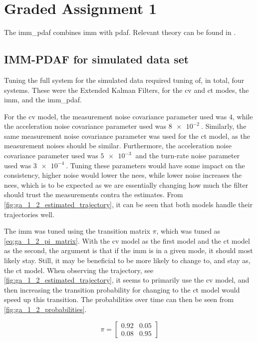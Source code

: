 \section{Graded Assignment 1}\label{sec:graded_assignment_1}
The \acrshort{imm_pdaf} combines \acrfull{imm} with \acrfull{pdaf}. Relevant theory can be found in \cite[p. 100-101, 120 - 122]{Edmund}. 

\subsection{IMM-PDAF for simulated data set}
Tuning the full system for the simulated data required tuning of, in total, four systems. These were the Extended Kalman Filters, for the \acrfull{cv} and \acrfull{ct} modes, the \acrshort{imm}, and the \acrshort{imm_pdaf}. 

For the \acrshort{cv} model, the measurement noise covariance parameter used was $4$, while the acceleration noise covariance parameter used was $\SI{8e-2}{}$. Similarly, the same measurement noise covariance parameter was used for the \acrshort{ct} model, as the measurement noises should be similar. Furthermore, the acceleration noise covariance parameter used was $\SI{5e-3}{}$ and the turn-rate noise parameter used was $\SI{3e-4}{}$. Tuning these parameters would have some impact on the consistency, higher noise would lower the \acrshort{nees}, while lower noise increases the \acrshort{nees}, which is to be expected as we are essentially changing how much the filter should trust the measurements contra the estimates. From \cref{fig:ga_1_2_estimated_trajectory}, it can be seen that both models handle their trajectories well. 

The \acrshort{imm} was tuned using the transition matrix $\pi$, which was tuned as \cref{eq:ga_1_2_pi_matrix}. With the \acrshort{cv} model as the first model and the \acrshort{ct} model as the second, the argument is that if the \acrshort{imm} is in a given mode, it should most likely stay. Still, it may be beneficial to be more likely to change to, and stay as, the \acrshort{ct} model. When observing the trajectory, see \cref{fig:ga_1_2_estimated_trajectory}, it seems to primarily use the \acrshort{cv} model, and then increasing the transition probability for changing to the \acrshort{ct} model would speed up this transition. The probabilities over time can then be seen from \cref{fig:ga_1_2_probabilities}.

\begin{equation}
    \label{eq:ga_1_2_pi_matrix}
    \pi = \begin{bmatrix}
        0.92 & 0.05 \\
        0.08 & 0.95
    \end{bmatrix}
\end{equation}

